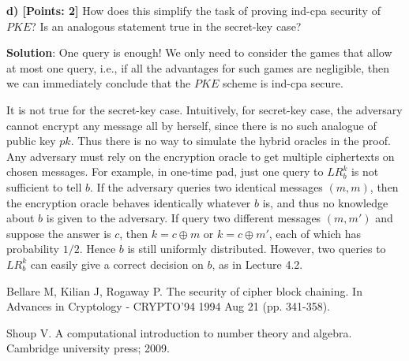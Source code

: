 \documentclass[12pt]{article}
\theoremstyle{definition}
\begin{document}
{\bf d) [Points: 2]} How does this simplify the task of proving ind-cpa security of $PKE$? Is an
analogous statement true in the secret-key case?

{\bf Solution}: One query is enough! We only need to consider the games that allow at most one query, i.e., if all the advantages for such games are negligible, then we can immediately conclude that the $PKE$ scheme is ind-cpa secure.

It is not true for the secret-key case. Intuitively, for secret-key case, the adversary cannot encrypt any message all by herself, since there is no such analogue of public key $pk$. Thus there is no way to simulate the hybrid oracles in the proof. Any adversary must rely on the encryption oracle to get multiple ciphertexts on chosen messages. For example, in one-time pad, just one query to $LR_b^k$ is not sufficient to tell $b$. If the adversary queries two identical messages $(m, m)$, then the encryption oracle behaves identically whatever $b$ is, and thus no knowledge about $b$ is given to the adversary. If query two different messages $(m,m')$ and suppose the answer is $c$, then $k = c \oplus m$ or $k = c \oplus m'$, each of which has probability $1/2$. Hence $b$ is still uniformly distributed. However, two queries to $LR_b^k$ can easily give a correct decision on $b$, as in Lecture 4.2.

\begin{thebibliography}{10}
Bellare M, Kilian J, Rogaway P. The security of cipher block chaining. In Advances in Cryptology - CRYPTO’94 1994 Aug 21 (pp. 341-358).

Shoup V. A computational introduction to number theory and algebra. Cambridge university press; 2009.
\end{thebibliography}
\end{document}
